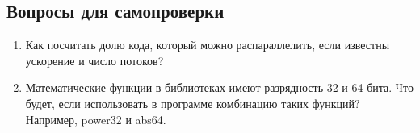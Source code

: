 \subsection{Вопросы для самопроверки}
\begin{enumerate}
    \item Как посчитать долю кода, который можно распараллелить, если известны ускорение и число потоков?
    \item Математические функции в библиотеках имеют разрядность 32 и 64 бита. Что будет, если использовать в программе комбинацию таких функций? Например, power32 и abs64.
\end{enumerate}
